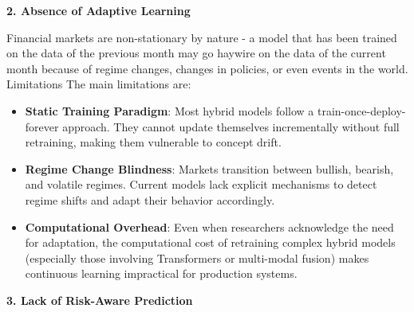 \textbf{2. Absence of Adaptive Learning}

Financial markets are non-stationary by nature - a model that has been trained on the data of the previous month may go haywire on the data of the current month because of regime changes, changes in policies, or even events in the world. Limitations The main limitations are:
\begin{itemize}
    \item \textbf{Static Training Paradigm}: Most hybrid models follow a train-once-deploy-forever approach. They cannot update themselves incrementally without full retraining, making them vulnerable to concept drift.
    
    \item \textbf{Regime Change Blindness}: Markets transition between bullish, bearish, and volatile regimes. Current models lack explicit mechanisms to detect regime shifts and adapt their behavior accordingly.
    
    \item \textbf{Computational Overhead}: Even when researchers acknowledge the need for adaptation, the computational cost of retraining complex hybrid models (especially those involving Transformers or multi-modal fusion) makes continuous learning impractical for production systems.
\end{itemize}

\textbf{3. Lack of Risk-Aware Prediction}

